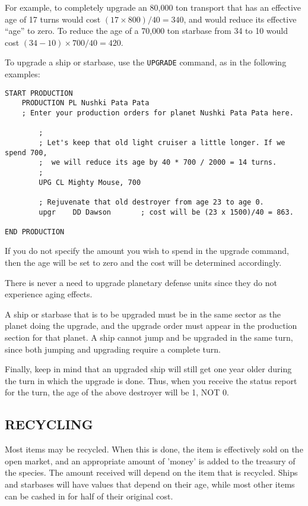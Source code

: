 \documentclass[10pt,titlepage]{article}
\begin{document}
For example, to completely upgrade an 80,000 ton transport that has an
effective age of 17 turns would cost $(17 \times 800) / 40 = 340$, and would reduce
its effective ``age'' to zero.  To reduce the age of a 70,000 ton starbase
from 34 to 10 would cost $(34 - 10) \times 700 / 40 = 420$.

To upgrade a ship or starbase, use the \texttt{UPGRADE} command, as in the following
examples:

\begin{verbatim}
START PRODUCTION
    PRODUCTION PL Nushki Pata Pata
    ; Enter your production orders for planet Nushki Pata Pata here.

        ;
        ; Let's keep that old light cruiser a little longer. If we spend 700,
        ;  we will reduce its age by 40 * 700 / 2000 = 14 turns.
        ;
        UPG CL Mighty Mouse, 700

        ; Rejuvenate that old destroyer from age 23 to age 0.
        upgr    DD Dawson       ; cost will be (23 x 1500)/40 = 863.

END PRODUCTION
\end{verbatim} 

If you do not specify the amount you wish to spend in the upgrade command, then
the age will be set to zero and the cost will be determined accordingly.

There is never a need to upgrade planetary defense units since they do not
experience aging effects.

A ship or starbase that is to be upgraded must be in the same sector as the
planet doing the upgrade, and the upgrade order must appear in the production
section for that planet.  A ship cannot jump and be upgraded in the same turn,
since both jumping and upgrading require a complete turn.

Finally, keep in mind that an upgraded ship will still get one year older
during the turn in which the upgrade is done.  Thus, when you receive the
status report for the turn, the age of the above destroyer will be 1, NOT 0.


\subsection{RECYCLING}
\label{sec:recycling}


Most items may be recycled.  When this is done, the item is effectively sold on
the open market, and an appropriate amount of 'money' is added to the treasury
of the species.  The amount received will depend on the item that is recycled.
Ships and starbases will have values that depend on their age, while most
other items can be cashed in for half of their original cost.
\end{document}
